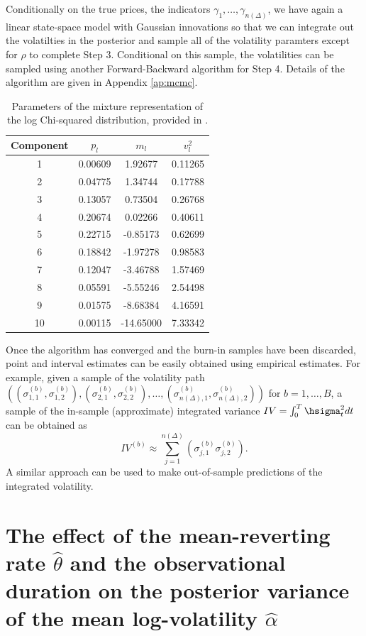Conditionally on the true prices, the indicators $\gamma_{1}, \ldots, \gamma_{n(\Delta)}$, we have again a linear state-space model with Gaussian innovations so that we can integrate out the volatilties in the posterior and sample all of the volatility paramters except for $\rho$ to complete Step 3. Conditional on this sample, the volatilities can be sampled using another Forward-Backward algorithm for Step 4. Details of the algorithm are given in Appendix \ref{ap:mcmc}.
\begin{table}
\begin{center}
\begin{tabular}{c|ccc}
Component   &   $p_l$   &   $m_l$   &   $v^2_l$  \\ \hline
1 & 0.00609 & 1.92677 & 0.11265 \\
2 & 0.04775 & 1.34744 & 0.17788 \\
3 & 0.13057 & 0.73504 & 0.26768 \\
4 & 0.20674 & 0.02266 & 0.40611 \\
5 & 0.22715 & -0.85173 & 0.62699 \\
6 & 0.18842 &-1.97278 & 0.98583 \\
7 & 0.12047 & -3.46788  & 1.57469 \\
8 & 0.05591 & -5.55246 & 2.54498 \\
9 & 0.01575 & -8.68384 & 4.16591 \\
10 & 0.00115 & -14.65000 & 7.33342
\end{tabular}
\caption{Parameters of the mixture representation of the log Chi-squared distribution, provided in \cite{omori2007stochastic}.}\label{ta:mixture_parameters}
\end{center}
\end{table}

Once the algorithm has converged and the burn-in samples have been discarded, point and interval estimates can be easily obtained using empirical estimates.  For example, given a sample of the volatility path $\left( (\sigma^{(b)}_{1,1},\sigma^{(b)}_{1,2}), (\sigma^{(b)}_{2,1},\sigma^{(b)}_{2,2}), \ldots,  (\sigma^{(b)}_{n(\Delta),1}, \sigma^{(b)}_{n(\Delta),2}) \right)$ for $b=1, \ldots, B$, a sample of the in-sample (approximate) integrated variance $IV = \int_0^T \hsigma^2_t dt$ can be obtained as
$$
IV^{(b)} \approx \sum_{j=1}^{n(\Delta)} \left( \sigma^{(b)}_{j,1}\sigma^{(b)}_{j,2} \right)   .
$$
A similar approach can be used to make out-of-sample predictions of the integrated volatility.


\section{The effect of the mean-reverting rate $\hat{\theta}$ and the observational duration on the posterior variance of the mean log-volatility $\hat{\alpha}$}\label{effect-mean-reverting-rate}


